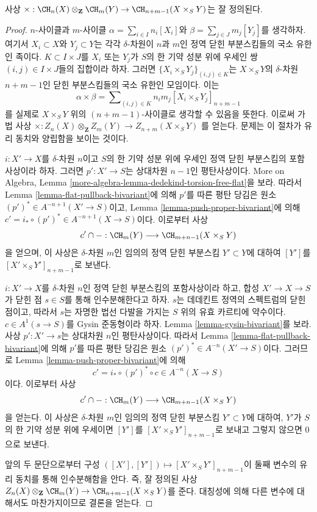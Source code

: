 \begin{lemma}
\label{lemma-exterior-product-well-defined-dim-1}
사상 $\times : \CH_n(X) \otimes_{\mathbf{Z}} \CH_m(Y) \to
\CH_{n + m - 1}(X \times_S Y)$는 잘 정의된다.
\end{lemma}

\begin{proof}
$n$-사이클과 $m$-사이클
$\alpha = \sum_{i \in I} n_i[X_i]$와
$\beta = \sum_{j \in J} m_j[Y_j]$를 생각하자. 여기서
$X_i \subset X$와 $Y_j \subset Y$는 각각 $\delta$-차원이 $n$과
$m$인 정역 닫힌 부분스킴들의 국소 유한인 족이다.
$K \subset I \times J$를 $X_i$ 또는 $Y_j$가 $S$의 한 기약 성분 위에
우세인 쌍 $(i, j) \in I \times J$들의 집합이라 하자. 그러면
$\{X_i \times_S Y_j\}_{(i, j) \in K}$는 $X \times_S Y$의
$\delta$-차원 $n + m - 1$인 닫힌 부분스킴들의 국소 유한인 모임이다.
이는
$$
\alpha \times \beta =
\sum\nolimits_{(i, j) \in K} n_i m_j [X_i \times_S Y_j]_{n + m - 1}
$$
를 실제로 $X \times_S Y$ 위의 $(n + m - 1)$-사이클로 생각할 수
있음을 뜻한다. 이로써 가법 사상
$\times : Z_n(X) \otimes_{\mathbf{Z}} Z_m(Y) \to Z_{n + m}(X \times_S Y)$
를 얻는다. 문제는 이 절차가 유리 동치와 양립함을 보이는 것이다.

\medskip\noindent
$i : X' \to X$를 $\delta$-차원 $n$이고 $S$의 한 기약 성분 위에
우세인 정역 닫힌 부분스킴의 포함사상이라 하자. 그러면
$p' : X' \to S$는 상대차원 $n - 1$인 평탄사상이다. More on Algebra,
Lemma \ref{more-algebra-lemma-dedekind-torsion-free-flat}을 보라. 따라서
Lemma \ref{lemma-flat-pullback-bivariant}에 의해 $p'$를 따른 평탄
당김은 원소 $(p')^* \in A^{-n + 1}(X' \to S)$이고, Lemma
\ref{lemma-push-proper-bivariant}에 의해
$c' = i_* \circ (p')^* \in A^{-n + 1}(X \to S)$이다. 이로부터 사상
$$
c' \cap - : \CH_m(Y) \longrightarrow \CH_{m + n - 1}(X \times_S Y)
$$
을 얻으며, 이 사상은 $\delta$-차원 $m$인 임의의 정역 닫힌 부분스킴
$Y' \subset Y$에 대하여 $[Y']$를
$[X' \times_S Y']_{n + m - 1}$로 보낸다.

\medskip\noindent
$i : X' \to X$를 $\delta$-차원 $n$인 정역 닫힌 부분스킴의
포함사상이라 하고, 합성 $X' \to X \to S$가 닫힌 점 $s \in S$를 통해
인수분해한다고 하자. $s$는 데데킨트 정역의 스펙트럼의 닫힌
점이고, 따라서 $s$는 자명한 법선 다발을 가지는 $S$ 위의 유효 카르티에
약수이다. $c \in A^1(s \to S)$를 Gysin 준동형이라 하자. Lemma
\ref{lemma-gysin-bivariant}를 보라. 사상 $p' : X' \to s$는
상대차원 $n$인 평탄사상이다. 따라서 Lemma
\ref{lemma-flat-pullback-bivariant}에 의해 $p'$를 따른 평탄 당김은
원소 $(p')^* \in A^{-n}(X' \to S)$이다. 그러므로 Lemma
\ref{lemma-push-proper-bivariant}에 의해
$$
c' = i_* \circ (p')^* \circ c \in A^{-n}(X \to S)
$$
이다. 이로부터 사상
$$
c' \cap - : \CH_m(Y) \longrightarrow \CH_{m + n - 1}(X \times_S Y)
$$
을 얻는다. 이 사상은 $\delta$-차원 $m$인 임의의 정역 닫힌 부분스킴
$Y' \subset Y$에 대하여, $Y'$가 $S$의 한 기약 성분 위에 우세이면
$[Y']$를 $[X' \times_S Y']_{n + m - 1}$로 보내고 그렇지 않으면
$0$으로 보낸다.

\medskip\noindent
앞의 두 문단으로부터 구성
$([X'], [Y']) \mapsto [X' \times_S Y']_{n + m - 1}$이 둘째 변수의
유리 동치를 통해 인수분해함을 안다. 즉, 잘 정의된 사상
$Z_n(X) \otimes_{\mathbf{Z}} \CH_m(Y) \to \CH_{n + m - 1}(X \times_S Y)$를
준다. 대칭성에 의해 다른 변수에
대해서도 마찬가지이므로 결론을 얻는다.
\end{proof}

